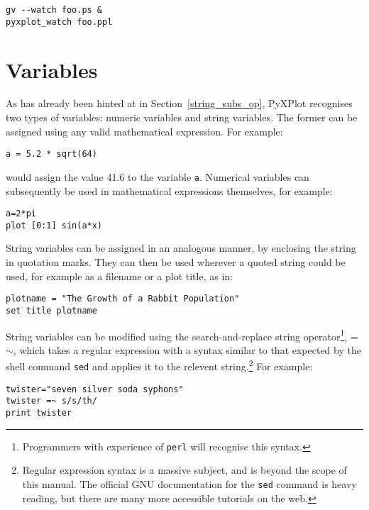 \begin{verbatim}
gv --watch foo.ps &
pyxplot_watch foo.ppl
\end{verbatim}

\section{Variables}

As has already been hinted at in Section~\ref{string_subs_op}, PyXPlot
recognises two types of variables: numeric variables and string variables.  The
former can be assigned using any valid mathematical expression. For example:

\begin{verbatim}
a = 5.2 * sqrt(64)
\end{verbatim}

\noindent would assign the value 41.6 to the variable {\tt a}.  Numerical variables can
subsequently be used in mathematical expressions themselves, for example:

\begin{verbatim}
a=2*pi
plot [0:1] sin(a*x)
\end{verbatim}

\noindent String variables can be assigned in an analogous manner, by enclosing
the string in quotation marks. They can then be used wherever a quoted string
could be used, for example as a filename or a plot title, as
in:

\begin{verbatim}
plotname = "The Growth of a Rabbit Population"
set title plotname
\end{verbatim}

String variables can be modified using the search-and-replace string
operator\footnote{Programmers with
experience of {\tt perl} will recognise this syntax.}, =$\sim$, which takes a regular expression with a syntax similar to that
expected by the shell command {\tt sed} and applies it to the relevent string.\footnote{Regular expression
syntax is a massive subject, and is beyond the scope of this manual. The
official GNU documentation for the {\tt sed} command is heavy reading, but
there are many more accessible tutorials on the web.} For example:

\begin{verbatim}
twister="seven silver soda syphons"
twister =~ s/s/th/
print twister
\end{verbatim}

